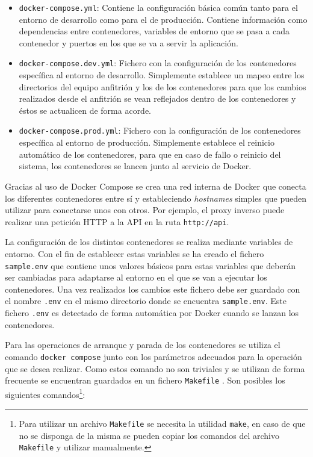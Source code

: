 \begin{itemize}
    \item \texttt{docker-compose.yml}: Contiene la configuración básica común
          tanto para el entorno de desarrollo como para el de producción.
          Contiene información como dependencias entre contenedores, variables
          de entorno que se pasa a cada contenedor y puertos en los que se va a
          servir la aplicación.
    \item \texttt{docker-compose.dev.yml}: Fichero con la configuración de los
          contenedores específica al entorno de desarrollo. Simplemente
          establece un mapeo entre los directorios del equipo anfitrión y los de
          los contenedores para que los cambios realizados desde el anfitrión se
          vean reflejados dentro de los contenedores y éstos se actualicen de
          forma acorde.
    \item \texttt{docker-compose.prod.yml}: Fichero con la configuración de los
          contenedores específica al entorno de producción. Simplemente
          establece el reinicio automático de los contenedores, para que en caso
          de fallo o reinicio del sistema, los contenedores se lancen junto al
          servicio de Docker.
\end{itemize}

Gracias al uso de Docker Compose se crea una red interna de Docker que conecta
los diferentes contenedores entre sí y estableciendo \textit{hostnames} simples
que pueden utilizar para conectarse unos con otros. Por ejemplo, el proxy
inverso puede realizar una petición HTTP a la API en la ruta
\texttt{http://api}.

La configuración de los distintos contenedores se realiza mediante variables de
entorno. Con el fin de establecer estas variables se ha creado el fichero
\texttt{sample.env} que contiene unos valores básicos para estas variables que
deberán ser cambiadas para adaptarse al entorno en el que se van a ejecutar los
contenedores. Una vez realizados los cambios este fichero debe ser guardado con
el nombre \texttt{.env} en el mismo directorio donde se encuentra
\texttt{sample.env}. Este fichero \texttt{.env} es detectado de forma automática
por Docker cuando se lanzan los contenedores.

Para las operaciones de arranque y parada de los contenedores se utiliza el
comando \texttt{docker compose} junto con los parámetros adecuados para la
operación que se desea realizar. Como estos comando no son triviales y se
utilizan de forma frecuente se encuentran guardados en un fichero
\texttt{Makefile}
. Son posibles los siguientes comandos\footnote{Para utilizar un archivo
    \texttt{Makefile} se necesita la utilidad \texttt{make}, en caso de que no
    se disponga de la misma se pueden copiar los comandos del archivo
    \texttt{Makefile} y utilizar manualmente.}:

